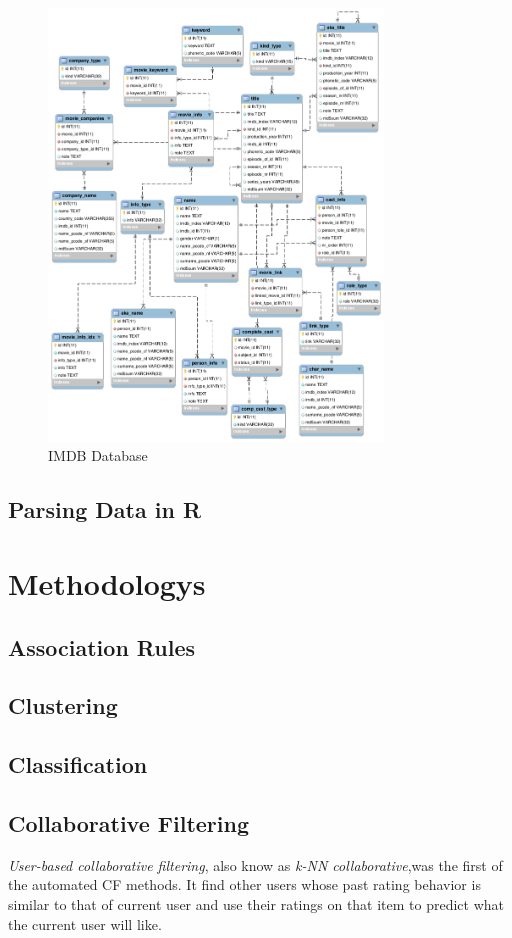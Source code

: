 \documentclass[conference]{IEEEtran}
\begin{document}
\begin{figure}
	\centering
	\includegraphics[width=3.5in]{ERgraph.png}
	\caption{IMDB Database}
	\label{fig:side:a}
\end{figure}

\subsection{Parsing Data in R}


\section{Methodologys}
\subsection{Association Rules}
\subsection{Clustering}
\subsection{Classification}
\subsection{Collaborative Filtering}

\textit{User-based collaborative filtering}, also know as \textit{k-NN collaborative},was the first of the automated CF methods. It find other users whose past rating behavior is similar to that of current user and
use their ratings on that item to predict what the current user will like. 
\end{document}
